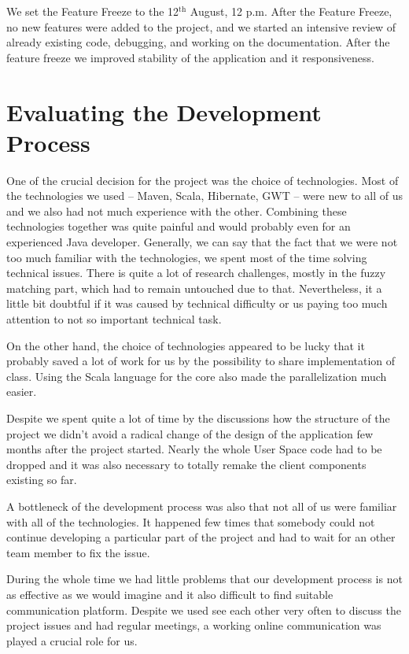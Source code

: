 {We set the Feature Freeze to the 12$^\mathrm{th}$ August, 12 p.m.
After the Feature Freeze, no new features were added to the project, and 
we started an intensive review of already existing code, debugging, and 
working on the documentation. After the feature freeze we improved 
stability of the application and it responsiveness. 


\section{Evaluating the Development Process}

One of the crucial decision for the project was the choice of technologies. Most of the technologies we used -- Maven, Scala, Hibernate, GWT -- were new to all of us and we also had not much experience with the other. Combining these technologies together was quite painful and would probably even for an experienced Java developer. Generally, we can say that the fact that we were not too much familiar with the technologies, we spent most of the time solving technical issues. There is quite a lot of research challenges, mostly in the fuzzy matching part, which had to remain untouched due to that. Nevertheless, it a little bit doubtful if it was caused by technical difficulty or us paying too much attention to not so important technical task.

On the other hand, the choice of technologies appeared to be lucky that it probably saved a lot of work for us by the possibility to share implementation of class. Using the Scala language for the core also made the parallelization much easier.

Despite we spent quite a lot of time by the discussions how the structure of the project we didn't avoid a radical change of the design of the application few months after the project started. Nearly the whole User Space code had to be dropped and it was also necessary to totally remake the client components existing so far.

A bottleneck of the development process was also that not all of us were familiar with all of the technologies. It happened few times that somebody could not continue developing a particular part of the project and had to wait for an other team member to fix the issue.

During the whole time we had little problems that our development process is not as effective as we would imagine and it also difficult to find suitable communication platform. Despite we used see each other very often to discuss the project issues and had regular meetings, a working online communication was played a crucial role for us.

}
